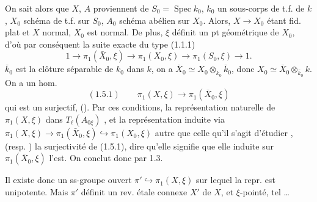 \documentclass[11pt,a4paper]{article}
\begin{document}
On sait alors que $X$, $A$ proviennent de $S_0 = \operatorname{Spec} k_0$, $k_0$ un sous-corps de t.f. de $k$, $X_0$ schéma de t.f. sur $S_0$, $A_0$ schéma abélien sur $X_0$. Alors, \struck{$\xi$ \ill{} \ill{} \ill{}}  $X \to X_0$ étant fid. plat et $X$ normal, $X_0$ est normal. De plus, $\xi$ définit un pt géométrique de $X_0$, d'où par conséquent \struck{\ill{} \ill{}} la suite exacte du type (1.1.1)
\[
1 \to \pi_1(\bar X_0, \xi) \longrightarrow \pi_1(X_0, \xi) \longrightarrow \pi_1(S_0, \xi) \to 1 .
\]
 \ill{} \ill{} $\bar k_0$ est la clôture séparable de $k_0$ dans $k$, on a $\bar X_0 \simeq X_0 \otimes_{k_0} \bar k_0$, donc $X_0 \simeq \bar X_0 \otimes_{\bar k_0} k$. On a un hom.
\[
(1.5.1) \qquad \pi_1(X,\xi) \longrightarrow \pi_1(\bar X_0, \xi)
\]
qui est un  surjectif, \struck{\ill{}} (). Par ces conditions, la représentation naturelle de $\pi_1(X,\xi)$ dans $T_\ell(A_{0\xi})$ , et la représentation induite via $\pi_1(X,\xi) \to \pi_1(\bar X_0, \xi) \hookrightarrow \pi_1(X_0, \xi)$ \ill{} \ill{} autre que celle qu'il s'agit d'étudier , \struck{\ill{}}  (resp. \struck{\ill{}} \ill{} \ill{}) la surjectivité de (1.5.1), dire qu'elle   signifie que elle induite sur $\pi_1(\bar X_0, \xi)$ l'est.  On conclut donc par 1.3.

Il existe donc un ss-groupe ouvert $\pi' \hookrightarrow \pi_1(X,\xi)$ sur lequel la repr. est unipotente. Mais $\pi'$ définit un rev. étale connexe $X'$ de $X$, et $\xi$-pointé, tel \ldots

\end{document}
